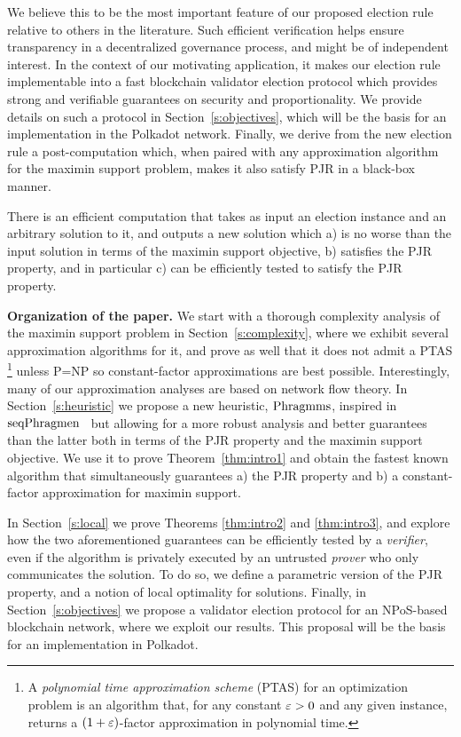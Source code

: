  We believe this to be the most important feature of our proposed election rule relative to others in the literature. 
Such efficient verification helps ensure transparency in a decentralized governance process, and might be of independent interest.  
In the context of our motivating application, it makes our election rule implementable into a fast blockchain validator election protocol which provides strong and verifiable guarantees on security and proportionality. 
We provide details on such a protocol in Section~\ref{s:objectives}, which will be the basis for an implementation in the Polkadot network.
%
Finally, we derive from the new election rule a post-computation which, when paired with any approximation algorithm for the maximin support problem, makes it also satisfy PJR in a black-box manner.

\begin{theorem}\label{thm:intro3}
There is an efficient computation that takes as input an election instance and an arbitrary solution to it, and outputs a new solution which a) is no worse than the input solution in terms of the maximin support objective, b) satisfies the PJR property, and in particular c) can be efficiently tested to satisfy the PJR property.
\end{theorem}

\textbf{Organization of the paper.}
We start with a thorough complexity analysis of the maximin support problem in Section~\ref{s:complexity}, 
where we exhibit several approximation algorithms for it, and prove as well that it does not admit a PTAS%
    \footnote{A \emph{polynomial time approximation scheme} (PTAS) for an optimization problem is an algorithm that, for any constant $\varepsilon>0$ and any given instance, returns a $(1+\varepsilon)$-factor approximation in polynomial time.} %
unless P=NP so constant-factor approximations are best possible. 
Interestingly, many of our approximation analyses are based on network flow theory. 
%
In Section~\ref{s:heuristic} we propose a new heuristic, $\operatorname{Phragmms}$, inspired in $\operatorname{seqPhragmen}$~\cite{brill2017phragmen} but allowing for a more robust analysis and better guarantees than the latter both in terms of the PJR property and the maximin support objective. We use it to prove Theorem~\ref{thm:intro1} and obtain the fastest known algorithm that simultaneously guarantees a) the PJR property and b) a constant-factor approximation for maximin support.

In Section~\ref{s:local} we prove Theorems \ref{thm:intro2} and \ref{thm:intro3}, and explore how the two aforementioned guarantees can be efficiently tested by a \emph{verifier}, even if the algorithm is privately executed by an untrusted \emph{prover} who only communicates the solution. 
To do so, we define a parametric version of the PJR property, and a notion of local optimality for solutions. 
%
Finally, in Section~\ref{s:objectives} we propose a validator election protocol for an NPoS-based blockchain network, where we exploit our results. This proposal will be the basis for an implementation in Polkadot. 
